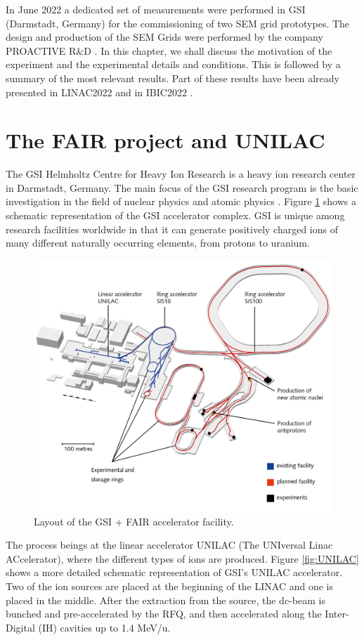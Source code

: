 \pagestyle{fancy}

\graphicspath{ {Figures/Chapter7_GSI/} }

In June 2022 a dedicated set of measurements were performed in GSI (Darmstadt, Germany) for the commissioning of two SEM grid prototypes. The design and production of the SEM Grids were performed by the company PROACTIVE R$\&$D \parencite[][]{ref:ProactiveRND}. In this chapter, we shall discuss the motivation of the experiment and the experimental details and conditions. This is followed by a summary of the most relevant results. Part of these results have been already presented in LINAC2022 \parencite[][]{ref:Linac2022Thomas} and in IBIC2022 \parencite[][]{ref:Ibic2022Juan}. 

\section{The FAIR project and UNILAC}

The GSI Helmholtz Centre for Heavy Ion Research is a heavy ion research center in Darmstadt, Germany. The main focus of the GSI research program is the basic investigation in the field of nuclear physics and atomic physics \parencite[][]{ref:GSI}. Figure \ref{fig:GSIlayout} shows a schematic representation of the GSI accelerator complex. GSI is unique among research facilities worldwide in that it can generate positively charged ions of many different naturally occurring elements, from protons to uranium. 

\begin{figure}[h]
    \centering
    \includegraphics[width=0.66\columnwidth]{GSIFacility/GSIFacility.jpg}
    \caption{Layout of the GSI + FAIR accelerator facility.}
    \label{fig:GSIlayout}
\end{figure}

The process beings at the linear accelerator UNILAC  (The UNIversal Linac ACcelerator), where the different types of ions are produced. Figure \ref{fig:UNILAC} shows a more detailed schematic representation of GSI's UNILAC accelerator. Two of the ion sources are placed at the beginning of the LINAC and one is placed in the middle. After the extraction from the source, the dc-beam is bunched and pre-accelerated by the RFQ, and then accelerated along the Inter-Digital (IH) cavities up to 1.4 MeV/u. 

